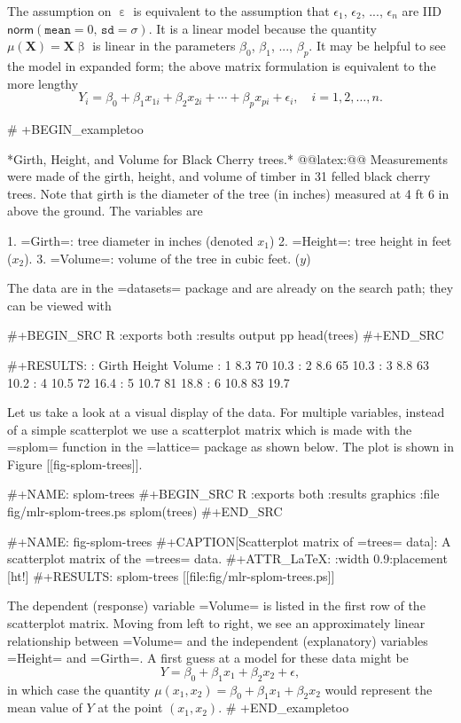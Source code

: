 The assumption on \(\upepsilon\) is equivalent to the assumption that
\(\epsilon_{1}\), \(\epsilon_{2}\), ..., \(\epsilon_{n}\) are IID
\(\mathsf{norm}(\mathtt{mean}=0,\,\mathtt{sd}=\sigma)\). It is a
linear model because the quantity
\(\mu(\mathbf{X})=\mathbf{X}\upbeta\) is linear in the parameters
\(\beta_{0}\), \(\beta_{1}\), ..., \(\beta_{p}\). It may be helpful to
see the model in expanded form; the above matrix formulation is
equivalent to the more lengthy
\begin{equation} 
Y_{i}=\beta_{0}+\beta_{1}x_{1i}+\beta_{2}x_{2i}+\cdots+\beta_{p}x_{pi}+\epsilon_{i},\quad i=1,2,\ldots,n.
\end{equation}

# +BEGIN_exampletoo

*Girth, Height, and Volume for Black Cherry trees.* @@latex:@@ Measurements were made of the girth,
height, and volume of timber in 31 felled black cherry trees. Note
that girth is the diameter of the tree (in inches) measured at 4 ft 6
in above the ground. The variables are

1. =Girth=: tree diameter in inches (denoted \(x_{1}\))
2. =Height=: tree height in feet (\(x_{2}\)).
3. =Volume=: volume of the tree in cubic feet. (\(y\))

The data are in the =datasets= package \cite{datasets} and are already
on the search path; they can be viewed with

#+BEGIN_SRC R :exports both :results output pp 
head(trees)
#+END_SRC

#+RESULTS:
:   Girth Height Volume
: 1   8.3     70   10.3
: 2   8.6     65   10.3
: 3   8.8     63   10.2
: 4  10.5     72   16.4
: 5  10.7     81   18.8
: 6  10.8     83   19.7

Let us take a look at a visual display of the data. For multiple
variables, instead of a simple scatterplot we use a scatterplot matrix
which is made with the =splom= function in the =lattice= package
\cite{lattice} as shown below. The plot is shown in Figure
[[fig-splom-trees]].

#+NAME: splom-trees
#+BEGIN_SRC R :exports both :results graphics :file fig/mlr-splom-trees.ps
splom(trees)
#+END_SRC

#+NAME: fig-splom-trees
#+CAPTION[Scatterplot matrix of =trees= data]: \small A scatterplot matrix of the =trees= data.
#+ATTR_LaTeX: :width 0.9\textwidth :placement [ht!]
#+RESULTS: splom-trees
[[file:fig/mlr-splom-trees.ps]]

The dependent (response) variable =Volume= is listed in the first row
of the scatterplot matrix. Moving from left to right, we see an
approximately linear relationship between =Volume= and the independent
(explanatory) variables =Height= and =Girth=. A first guess at a model
for these data might be
\begin{equation}
Y=\beta_{0}+\beta_{1}x_{1}+\beta_{2}x_{2}+\epsilon,
\end{equation}
in which case the quantity
\(\mu(x_{1},x_{2})=\beta_{0}+\beta_{1}x_{1}+\beta_{2}x_{2}\) would
represent the mean value of \(Y\) at the point \((x_{1},x_{2})\).
# +END_exampletoo


